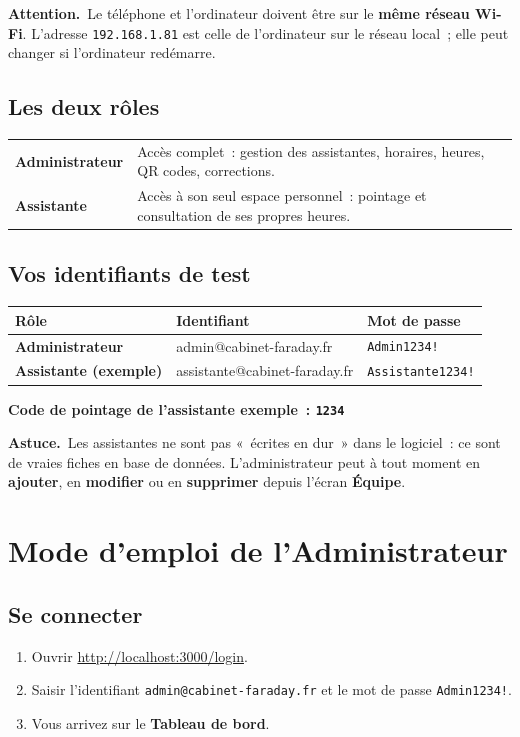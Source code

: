 \documentclass[11pt,a4paper]{article}
\newcommand{\encadre}[2]{%
  \par\smallskip\noindent
  \colorbox{#1}{\parbox{\dimexpr\linewidth-2\fboxsep}{\smallskip #2\smallskip}}%
  \par\smallskip}
\newcommand{\astuce}[1]{\encadre{faradaylight}{\textbf{\textcolor{faraday}{Astuce.}}~#1}}
\newcommand{\attention}[1]{\encadre{ambrelight}{\textbf{\textcolor{ambre}{Attention.}}~#1}}
\newcommand{\menu}[1]{\textbf{\textcolor{faraday}{#1}}}
\begin{document}
\attention{Le téléphone et l'ordinateur doivent être sur le \textbf{même réseau Wi-Fi}. L'adresse \texttt{192.168.1.81} est celle de l'ordinateur sur le réseau local~; elle peut changer si l'ordinateur redémarre.}

\subsection{Les deux rôles}

\begin{tabular}{>{\bfseries}p{3.2cm} p{11cm}}
\toprule
Administrateur & Accès complet~: gestion des assistantes, horaires, heures, QR codes, corrections. \\
\addlinespace
Assistante & Accès à son seul espace personnel~: pointage et consultation de ses propres heures. \\
\bottomrule
\end{tabular}

\subsection{Vos identifiants de test}

\begin{tabular}{>{\bfseries}p{3.2cm} p{5.5cm} p{3.2cm}}
\toprule
Rôle & Identifiant & Mot de passe \\
\midrule
Administrateur & admin@cabinet-faraday.fr & \texttt{Admin1234!} \\
Assistante (exemple) & assistante@cabinet-faraday.fr & \texttt{Assistante1234!} \\
\bottomrule
\end{tabular}

\smallskip
\textbf{Code de pointage de l'assistante exemple~: \texttt{1234}}

\astuce{Les assistantes ne sont pas «~écrites en dur~» dans le logiciel~: ce sont de vraies fiches en base de données. L'administrateur peut à tout moment en \textbf{ajouter}, en \textbf{modifier} ou en \textbf{supprimer} depuis l'écran \menu{Équipe}.}

\newpage

\section{Mode d'emploi de l'Administrateur}

\subsection{Se connecter}
\begin{enumerate}[leftmargin=1.6em]
  \item Ouvrir \url{http://localhost:3000/login}.
  \item Saisir l'identifiant \texttt{admin@cabinet-faraday.fr} et le mot de passe \texttt{Admin1234!}.
  \item Vous arrivez sur le \menu{Tableau de bord}.
\end{enumerate}
\end{document}
